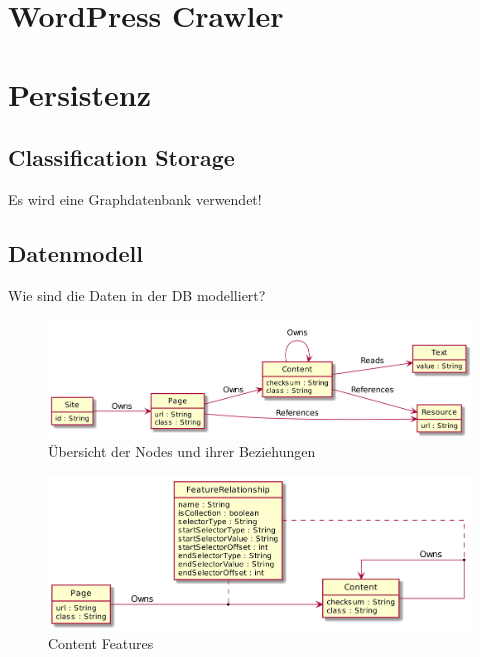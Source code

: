     \section{WordPress Crawler}

    \section{Persistenz}
        \subsection{Classification Storage}
            Es wird eine Graphdatenbank verwendet!
        
        \subsection{Datenmodell}
            Wie sind die Daten in der DB modelliert?
        
            \begin{figure}
                \centering
                \includegraphics[width=\textwidth]{../resources/db-data-model/nodes.png}
                \caption{Übersicht der Nodes und ihrer Beziehungen}
                \label{image:dbDataModelOverview}
            \end{figure}

            \begin{figure}
                \centering
                \includegraphics[width=\textwidth]{../resources/db-data-model/content-relationship.png}
                \caption{Content Features}
                \label{image:dbDataModelContentRelationship}
            \end{figure}

